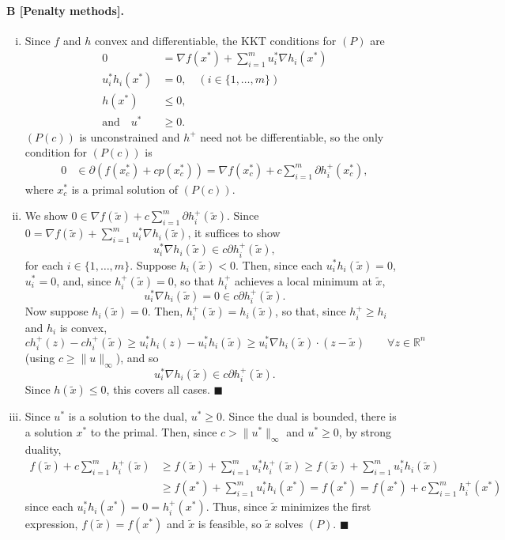 \documentclass[11pt]{article}
\newcommand{\R}{\mathbb{R}}
\renewcommand{\qed}{\quad \ensuremath{\blacksquare}}
\newcommand{\wx}{{\widetilde{x}}}
\begin{document}
\paragraph{B [Penalty methods].}
\begin{enumerate}[(i)]
\item Since $f$ and $h$ convex and differentiable, the KKT conditions for $(P)$
are
\begin{align*}
0 & = \nabla f(x^*) + \sum_{i = 1}^m u_i^*\nabla h_i(x^*)   \\
u_i^* h_i(x^*) & = 0, \quad (i \in \{1,\dots,m\})           \\
h(x^*) & \leq 0,                                            \\
\mbox{and} \quad u^* & \geq 0.
\end{align*}
$(P(c))$ is unconstrained and $h^+$ need not be differentiable, so the only
condition for $(P(c))$ is
\begin{align*}
0 & \in \partial \left( f(x_c^*) + cp(x_c^*) \right)
    = \nabla f(x_c^*) + c\sum_{i = 1}^m \partial h_i^+(x_c^*),
\end{align*}
where $x_c^*$ is a primal solution of $(P(c))$.
 
\item We show
$\displaystyle 0  \in \nabla f(\wx) + c\sum_{i = 1}^m \partial h_i^+(\wx)$.
Since $\displaystyle 0 = \nabla f(\wx) + \sum_{i = 1}^m u_i^*\nabla h_i(\wx)$,
it suffices to show
\[u_i^*\nabla h_i(\wx) \in c\partial h_i^+(\wx),\]
for each $i \in \{1,\dots,m\}$. Suppose $h_i(\wx) < 0$. Then, since each
$u_i^*h_i(\wx) = 0$, $u_i^* = 0$, and, since $h_i^+(\wx) = 0$, so that $h_i^+$
achieves a local minimum at $\wx$,
\[u_i^*\nabla h_i(\wx) = 0 \in c\partial h_i^+(\wx).\]
Now suppose $h_i(\wx) = 0$. Then, $h_i^+(\wx) = h_i(\wx)$, so that, since
$h_i^+ \geq h_i$ and $h_i$ is convex,
\[ch_i^+(z) - ch_i^+(\wx) \geq u_i^*h_i(z) - u_i^*h_i(\wx)
    \geq u_i^*\nabla h_i(\wx) \cdot (z - \wx) \quad \quad \forall z \in \R^n\]
(using $c \geq \|u\|_\infty$), and so
\[u_i^*\nabla h_i(\wx) \in c\partial h_i^+(\wx).\]
Since $h(\wx) \leq 0$, this covers all cases. \qed
 
\item Since $u^*$ is a solution to the dual, $u^* \geq 0$. Since the dual is
bounded, there is a solution $x^*$ to the primal. Then, since
$c > \|u^*\|_\infty$ and $u^* \geq 0$, by strong duality,
\begin{align*}
f(\wx) + c\sum_{i = 1}^m h_i^+(\wx)
 &  \geq f(\wx) + \sum_{i = 1}^m u_i^* h_i^+(\wx)
    \geq f(\wx) + \sum_{i = 1}^m u_i^* h_i(\wx)     \\
 &  \geq f(x^*) + \sum_{i = 1}^m u_i^* h_i(x^*)
    = f(x^*)
    = f(x^*) + c\sum_{i = 1}^m h_i^+(x^*)
\end{align*}
since each $u_i^*h_i(x^*) = 0 = h_i^+(x^*)$. Thus, since $\wx$ minimizes the
first expression, $f(\wx) = f(x^*)$ and $\wx$ is feasible, so $\wx$ solves
$(P)$. \qed 
\end{enumerate}
\end{document}
